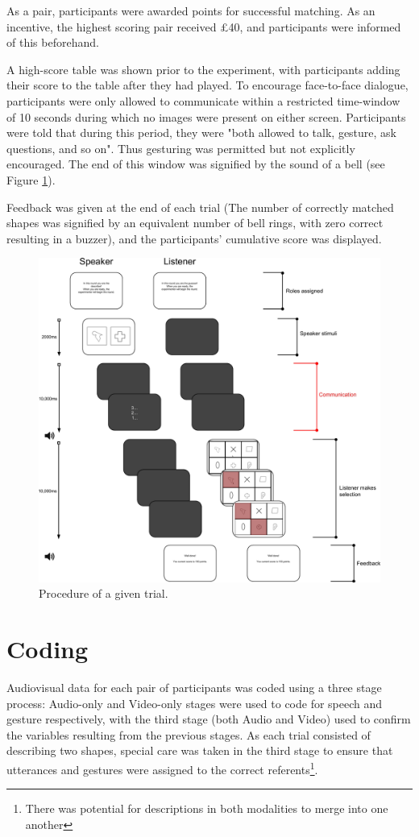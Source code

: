 \documentclass[a4paper,man,natbib]{apa6}
\begin{document}
As a pair, participants were awarded points for successful matching.
As an incentive, the highest scoring pair received £40, and participants were informed of this beforehand.

A high-score table was shown prior to the experiment, with participants adding their score to the table after they had played.
To encourage face-to-face dialogue, participants were only allowed to communicate within a restricted time-window of 10 seconds during which no images were present on either screen. 
Participants were told that during this period, they were "both allowed to talk, gesture, ask questions, and so on". 
Thus gesturing was permitted but not explicitly encouraged.
The end of this window was signified by the sound of a bell (see Figure \ref{fig:trial}).

Feedback was given at the end of each trial (The number of correctly matched shapes was signified by an equivalent number of bell rings, with zero correct resulting in a buzzer), and the participants' cumulative score was displayed.

\begin{figure}
  \centering
	\includegraphics[width=\linewidth]{trial.png}
  \caption{Procedure of a given trial.}
  \label{fig:trial}
\end{figure}

\section{Coding}
Audiovisual data for each pair of participants was coded using a three stage process:
Audio-only and Video-only stages were used to code for speech and gesture respectively, with the third stage (both Audio and Video) used to confirm the variables resulting from the previous stages.
As each trial consisted of describing two shapes, special care was taken in the third stage to ensure that utterances and gestures were assigned to the correct referents\footnote{There was potential for descriptions in both modalities to merge into one another}.
\end{document}
